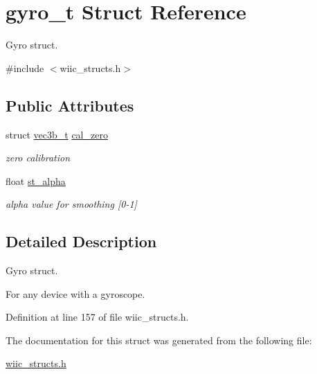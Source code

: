 \hypertarget{structgyro__t}{\section{gyro\-\_\-t \-Struct \-Reference}
\label{structgyro__t}
}


\-Gyro struct.  




{\ttfamily \#include $<$wiic\-\_\-structs.\-h$>$}

\subsection*{\-Public \-Attributes}
\begin{DoxyCompactItemize}
\item 
\hypertarget{structgyro__t_a1a2b1fdd479dd7cbd2f70b2a2cd93e0b}{struct \hyperlink{structvec3b__t}{vec3b\-\_\-t} \hyperlink{structgyro__t_a1a2b1fdd479dd7cbd2f70b2a2cd93e0b}{cal\-\_\-zero}}\label{structgyro__t_a1a2b1fdd479dd7cbd2f70b2a2cd93e0b}

\begin{DoxyCompactList}\small\item\em zero calibration \end{DoxyCompactList}\item 
\hypertarget{structgyro__t_a05d652ae9beed165d906573c002c7560}{float \hyperlink{structgyro__t_a05d652ae9beed165d906573c002c7560}{st\-\_\-alpha}}\label{structgyro__t_a05d652ae9beed165d906573c002c7560}

\begin{DoxyCompactList}\small\item\em alpha value for smoothing \mbox{[}0-\/1\mbox{]} \end{DoxyCompactList}\end{DoxyCompactItemize}


\subsection{\-Detailed \-Description}
\-Gyro struct. 

\-For any device with a gyroscope. 

\-Definition at line 157 of file wiic\-\_\-structs.\-h.



\-The documentation for this struct was generated from the following file\-:\begin{DoxyCompactItemize}
\item 
\hyperlink{wiic__structs_8h}{wiic\-\_\-structs.\-h}\end{DoxyCompactItemize}
